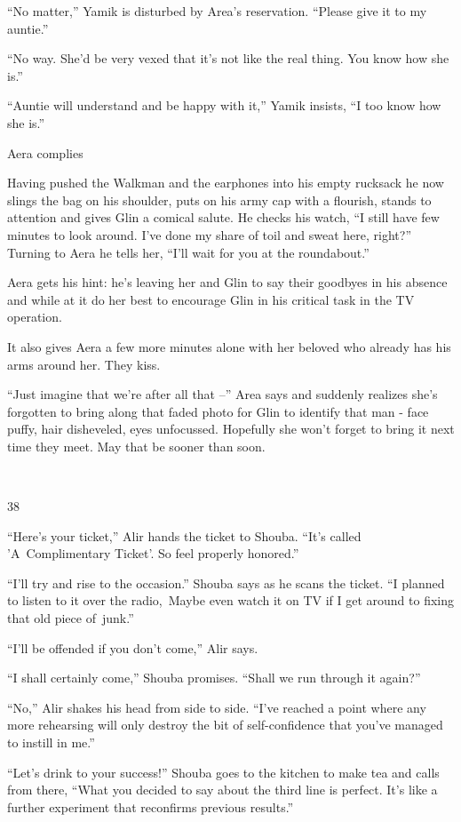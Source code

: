 \documentclass[twoside,11pt]{book}
\begin{document}
``No matter,'' Yamik is disturbed by Area's reservation. ``Please give it to my
auntie.'' 

``No way. She'd be very vexed that it's not like the real thing. You know how she is.'' 

``Auntie will understand and be happy with it,'' Yamik insists, ``I too know how
she is.''

Aera complies

Having pushed the Walkman and the earphones into his empty rucksack he now slings the bag on his shoulder, puts on his
army cap with a flourish, stands to attention and gives Glin a comical salute. He checks his watch, ``I
still have few minutes to look around. I've done my share of toil and sweat here, right?'' Turning to Aera
he tells her, ``I'll wait for you at the roundabout.''

Aera gets his hint: he's leaving her and Glin to say their goodbyes in his absence and while at it do her best to
encourage Glin in his critical task in the TV operation.\ 

It also gives Aera a few more minutes alone with her beloved who already has his arms around her. They kiss. \ 

``Just imagine that we're after all that --'' Area says and suddenly realizes she's forgotten
to bring along that faded photo for Glin to identify that man - face puffy, hair disheveled, eyes unfocussed. Hopefully
she won't forget to bring it next time they meet. May that be sooner than soon.

~

38 

``Here's your ticket,'' Alir hands the ticket to Shouba. ``It's called
'A\ Complimentary Ticket'. So feel properly honored.'' 

``I'll try and rise to the occasion.'' Shouba says as he scans the ticket. ``I
planned to listen to it over the radio,\ Maybe even watch it on TV if I get around to fixing that old piece
of~junk.'' 

``I'll be offended if you don't come,'' Alir says. 

``I shall certainly come,'' Shouba promises. ``Shall we run through it
again?'' 

``No,'' Alir shakes his head from side to side. ``I've reached a point where any
more rehearsing will only destroy the bit of self-confidence that you{}'ve managed to instill in me.'' 

``Let's drink to your success!'' Shouba goes to the kitchen to make tea and calls from there,
``What you decided to say about the third line is perfect. It's like a further experiment that reconfirms
previous results.'' 
\end{document}
